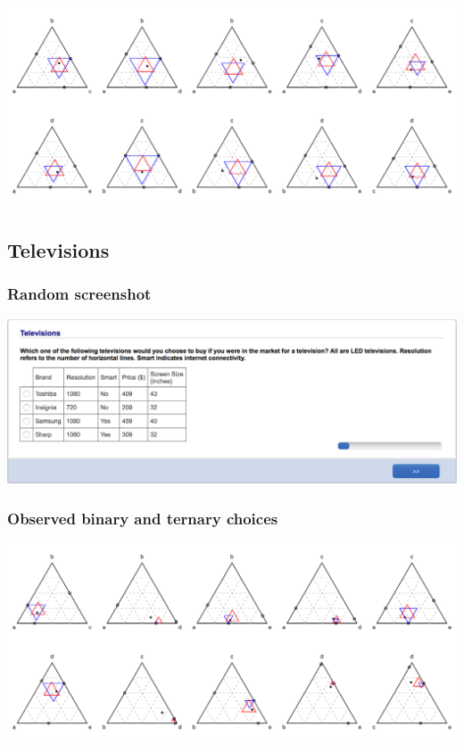 \documentclass[11pt,letter]{article}
\begin{document}
\includegraphics[width=15cm]{./Population_study_data/Simplexes/itineraries.pdf}

\pagebreak

\subsection*{Televisions}



\subsubsection*{Random screenshot}

\includegraphics[width=15cm]{Population_study_design/screenshot_televisions.png}

\subsubsection*{Observed binary and ternary choices}

\includegraphics[width=15cm]{./Population_study_data/Simplexes/televisions.pdf}
\end{document}
